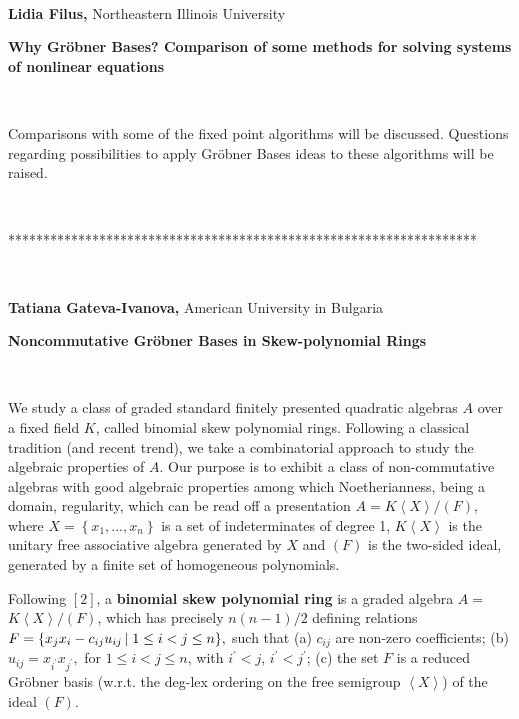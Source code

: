 \documentclass[12pt]{article}
\begin{document}
\vspace{.1in}\ 

\noindent \textbf{Lidia Filus, }Northeastern Illinois University

\noindent \textbf{Why Gr\"{o}bner Bases? Comparison of some methods for
solving systems of nonlinear equations}

\smallskip\ 

\noindent Comparisons with some of the fixed point algorithms will be
discussed. Questions regarding possibilities to apply Gr\"{o}bner Bases
ideas to these algorithms will be raised.

\smallskip\ 

\begin{center}
*******************************************************************
\end{center}

\vspace{.1in}\ 

\noindent \textbf{Tatiana Gateva-Ivanova, }American University in Bulgaria

\noindent \textbf{Noncommutative Gr\"{o}bner Bases in Skew-polynomial Rings}

\smallskip\ 

\noindent We study a class of graded standard finitely presented quadratic
algebras $A$ over a fixed field $K$, called binomial skew polynomial rings.
Following a classical tradition (and recent trend), we take a combinatorial
approach to study the algebraic properties of $A$. Our purpose is to exhibit
a class of non-commutative algebras with good algebraic properties among
which Noetherianness, being a domain, regularity, which can be read off a
presentation $A=K\left\langle X\right\rangle /(F)$, where $X=\left\{
x_1,...,x_n\right\} $ is a set of indeterminates of degree 1, $K\left\langle
X\right\rangle $ is the unitary free associative algebra generated by $X$
and $(F)$ is the two-sided ideal, generated by a finite set of homogeneous
polynomials.

Following $[2]$, a \textbf{binomial skew polynomial ring} is a graded
algebra $A=$ $K\left\langle X\right\rangle /(F)$, which has precisely $%
n(n-1)/2$ defining relations $F=\{x_jx_i-c_{ij}u_{ij}\left| \text{\\}\right.
1\leq i<j\leq n\},$ such that (a) $c_{ij}$ are non-zero coefficients; (b) $%
u_{ij}=x_{i^{\prime }}x_{j^{\prime }},$ for $1\leq i<j\leq n$, with $%
i^{\prime }<j$, $i^{\prime }<j^{\prime }$; (c) the set $F$ is a reduced
Gr\"{o}bner basis (w.r.t. the deg-lex ordering on the free semigroup $%
\left\langle X\right\rangle $) of the ideal $(F)$.
\end{document}
